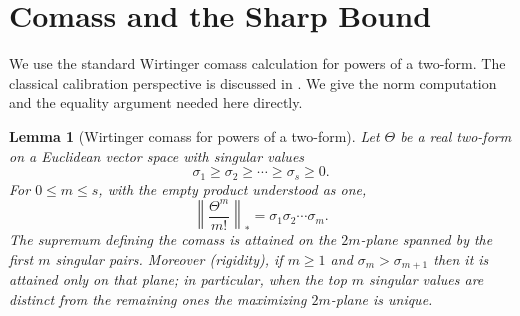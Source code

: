 \documentclass[11pt]{article}
\newtheorem{lemma}[theorem]{Lemma}
\begin{document}
\section{Comass and the Sharp Bound}

We use the standard Wirtinger comass calculation for powers of a two-form.  The
classical calibration perspective is discussed in \cite{HarveyLawson1982}.
We give the norm computation and the equality argument needed here directly.

\begin{lemma}[Wirtinger comass for powers of a two-form]
\label{lem:wirtinger}
Let \(\Theta\) be a real two-form on a Euclidean vector space with singular
values
\[
  \sigma_1\geq \sigma_2\geq \cdots \geq \sigma_s\geq 0.
\]
For \(0\le m\le s\), with the empty product understood as one,
\[
  \left\|\frac{\Theta^m}{m!}\right\|_*
  =
  \sigma_1\sigma_2\cdots\sigma_m.
\]
The supremum defining the comass is attained on the \(2m\)-plane spanned by the
first \(m\) singular pairs.  Moreover \emph{(rigidity)}, if \(m\ge1\) and
\(\sigma_m>\sigma_{m+1}\) then it is attained \emph{only} on that plane; in particular, when the top \(m\) singular
values are distinct from the remaining ones the maximizing \(2m\)-plane is
\emph{unique}.
\end{lemma}
\end{document}
